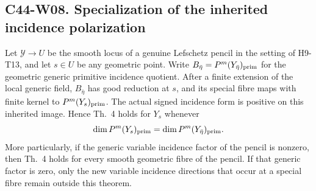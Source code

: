 \subsection*{C44-W08. Specialization of the inherited incidence polarization}

\begin{theorem}
Let $\mathscr Y\to U$ be the smooth locus of a genuine Lefschetz
pencil in the setting of H9-T13, and let $s\in U$ be any geometric
point. Write $B_{\bar\eta}=P^m(Y_{\bar\eta})_{\rm prim}$ for the
geometric generic primitive incidence quotient. After a finite
extension of the local generic field, $B_{\bar\eta}$ has good
reduction at $s$, and its special fibre maps with finite kernel to
$P^m(Y_s)_{\rm prim}$. The actual signed incidence form is positive
on this inherited image. Hence Th.~4 holds for $Y_s$ whenever
\begin{equation}\label{c44:no-incidence-jump}
 \dim P^m(Y_s)_{\rm prim}=\dim P^m(Y_{\bar\eta})_{\rm prim}.
\end{equation}
More particularly, if the generic variable incidence factor of the
pencil is nonzero, then Th.~4 holds for every smooth geometric fibre
of the pencil. If that generic factor is zero, only the new
variable incidence directions that occur at a special fibre remain
outside this theorem.
\end{theorem}

